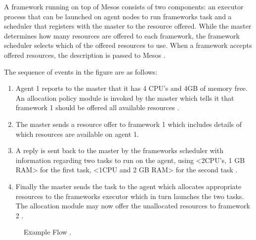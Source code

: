 \documentclass[9pt,twocolumn,twoside]{../../styles/osajnl}
\begin{document}
A framework running on top of Mesos consists of two components: an
executor process that can be launched on agent nodes to run frameworks
task and a scheduler that registers with the master to the resource
offered. While the master determines how many resources are offered to
each framework, the framework scheduler selects which of the offered
resources to use. When a framework accepts offered resources, the
description is passed to Mesos \cite{www-mesos-arch}.

The sequence of events in the figure are as follows:
\begin{enumerate}
\item Agent 1 reports to the master that it has 4 CPU's and 4GB of
  memory free.  An allocation policy module is invoked by the master
  which tells it that framework 1 should be offered all available
  resources \cite{www-mesos-arch}.
\item The master sends a resource offer to framework 1 which includes
  details of which resources are available on agent 1.
\item A reply is sent back to the master by the frameworks scheduler
  with information regarding two tasks to run on the agent, using
  <2CPU's, 1 GB RAM> for the first task, <1CPU and 2 GB RAM> for the
  second task \cite{www-mesos-arch}.
\item Finally the master sends the task to the agent which allocates
  appropriate resources to the frameworks executor which in turn
  launches the two tasks. The allocation module may now offer the
  unallocated resources to framework 2 \cite{www-mesos-arch}.
\end{enumerate}

\begin{figure}[htbp]
\centering
{}
\caption{Example Flow \cite{www-mesos-arch}.}
\label{fig:false-color}
\end{figure}
\end{document}
